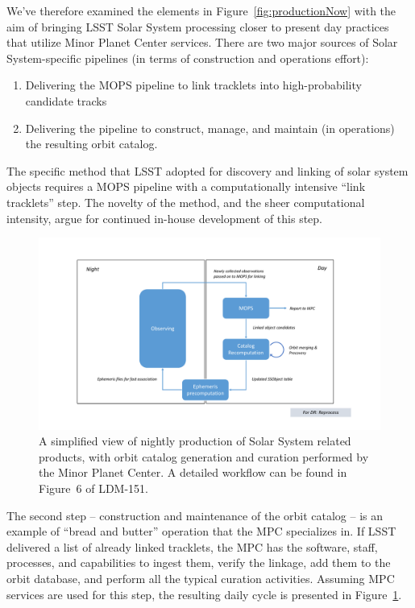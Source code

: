 \documentclass[DM,authoryear,toc]{lsstdoc}
\begin{document}
We've therefore examined the elements in Figure~\ref{fig:productionNow} with the aim of bringing LSST Solar System processing closer to present day practices that utilize Minor Planet Center services. There are two major sources of Solar System-specific pipelines (in terms of construction and operations effort):
\begin{enumerate}
	\item Delivering the MOPS pipeline to link tracklets into high-probability candidate tracks
	\item Delivering the pipeline to construct, manage, and maintain (in operations) the resulting orbit catalog.
\end{enumerate}
The specific method that LSST adopted for discovery and linking of solar system objects requires a MOPS pipeline with a computationally intensive ``link tracklets'' step. The novelty of the method, and the sheer computational intensity, argue for continued in-house development of this step.

\begin{figure}
	\caption{A simplified view of nightly production of Solar System related products, with orbit catalog generation and curation performed by the Minor Planet Center. A detailed workflow can be found in Figure~6 of LDM-151.\label{fig:productionNew}}
	\centering
	\includegraphics[page=2,width=1.0\textwidth]{figures/processing.pdf}
\end{figure}

The second step -- construction and maintenance of the orbit catalog -- is an example of ``bread and butter'' operation that the MPC specializes in. If LSST delivered a list of already linked tracklets, the MPC has the software, staff,  processes, and capabilities to ingest them, verify the linkage, add them to the orbit database, and perform all the typical curation activities. Assuming MPC services are used for this step, the resulting daily cycle is presented in Figure~\ref{fig:productionNew}.
\end{document}
